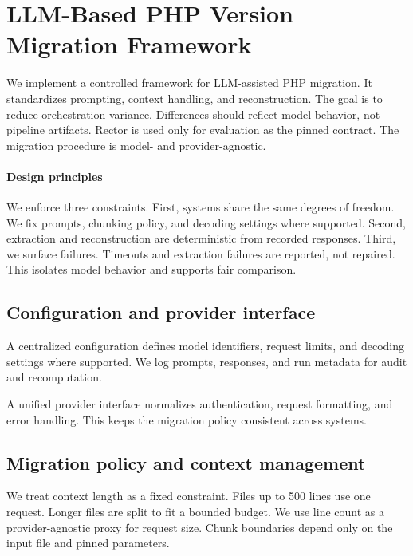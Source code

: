 \section{LLM-Based PHP Version Migration Framework}
\label{sec:migration_framework}

We implement a controlled framework for LLM-assisted PHP migration.
It standardizes prompting, context handling, and reconstruction.
The goal is to reduce orchestration variance.
Differences should reflect model behavior, not pipeline artifacts.
Rector is used only for evaluation as the pinned contract.\cite{rector}
The migration procedure is model- and provider-agnostic.

\paragraph*{Design principles}
We enforce three constraints.
First, systems share the same degrees of freedom.
We fix prompts, chunking policy, and decoding settings where supported.
Second, extraction and reconstruction are deterministic from recorded responses.
Third, we surface failures.
Timeouts and extraction failures are reported, not repaired.
This isolates model behavior and supports fair comparison.

\subsection{Configuration and provider interface}
\label{sec:framework_config}

A centralized configuration defines model identifiers, request limits, and decoding settings where supported.
We log prompts, responses, and run metadata for audit and recomputation.

A unified provider interface normalizes authentication, request formatting, and error handling.
This keeps the migration policy consistent across systems.

\subsection{Migration policy and context management}
\label{sec:framework_chunking}

We treat context length as a fixed constraint.\cite{liu2024lost,du2025context}
Files up to 500 lines use one request.
Longer files are split to fit a bounded budget.
We use line count as a provider-agnostic proxy for request size.
Chunk boundaries depend only on the input file and pinned parameters.

